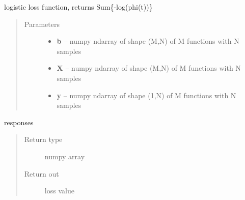 \documentclass[letterpaper,10pt,english]{sphinxmanual}
\begin{document}
\begin{fulllineitems}
\label{regression:regression.logit_loss}
logistic loss function, returns Sum\{-log(phi(t))\}
\begin{quote}\begin{description}
\item[{Parameters}] \leavevmode\begin{itemize}
\item {} 
\textbf{b} -- numpy ndarray of shape (M,N) of M functions with N samples

\item {} 
\textbf{X} -- numpy ndarray of shape (M,N) of M functions with N samples

\item {} 
\textbf{y} -- numpy ndarray of shape (1,N) of M functions with N samples

\end{itemize}

\end{description}\end{quote}

responses
\begin{quote}\begin{description}
\item[{Return type}] \leavevmode
numpy array

\item[{Return out}] \leavevmode
loss value

\end{description}\end{quote}

\end{fulllineitems}

\end{document}
